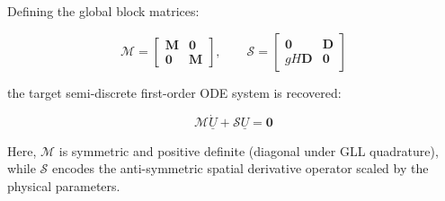 Defining the global block matrices:

\begin{equation}
\mathbf{\mathcal{M}} = \begin{bmatrix} \mathbf{M} & \mathbf{0} \\ \mathbf{0} & \mathbf{M} \end{bmatrix}, \qquad
\mathbf{\mathcal{S}} = \begin{bmatrix} \mathbf{0} & \mathbf{D} \\ gH\mathbf{D} & \mathbf{0} \end{bmatrix}
\label{eq:block_matrices}
\end{equation}

the target semi-discrete first-order ODE system is recovered:

\begin{equation}
\mathbf{\mathcal{M}} \dot{\underline{U}} + \mathbf{\mathcal{S}} \underline{U} = \mathbf{0}
\label{eq:block_ode}
\end{equation}

Here, \(\mathbf{\mathcal{M}}\) is symmetric and positive definite (diagonal under GLL quadrature), while \(\mathbf{\mathcal{S}}\) encodes the anti-symmetric spatial derivative operator scaled by the physical parameters.

